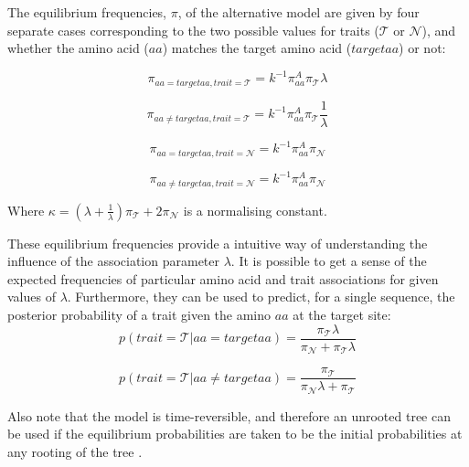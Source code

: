 \documentclass[]{article}
\begin{document}
The equilibrium frequencies, $\pi$, of the alternative model are given by four separate cases corresponding to the two possible values for traits ($\mathcal{T}$ or $\mathcal{N}$), and whether the amino acid ($aa$) matches the target amino acid ($targetaa$) or not:

\begin{equation}
\pi_{aa=targetaa,trait=\mathcal{T}}=k^{-1}\pi_{aa}^{A}\pi_{\mathcal{T}}\lambda
\end{equation}

\begin{equation}
\pi_{aa\neq targetaa,trait=\mathcal{T}}=k^{-1}\pi_{aa}^{A}\pi_{\mathcal{T}}\frac{1}{\lambda}
\end{equation}

\begin{equation}
\pi_{aa=targetaa,trait=\mathcal{N}}=k^{-1}\pi_{aa}^{A}\pi_{\mathcal{N}}
\end{equation}

\begin{equation}
\pi_{aa\neq targetaa,trait=\mathcal{N}}=k^{-1}\pi_{aa}^{A}\pi_{\mathcal{N}}
\end{equation}

Where $\kappa=(\lambda+\frac{1}{\lambda})\pi_{\mathcal{T}}+2\pi_{\mathcal{N}}$ is a normalising constant.

These equilibrium frequencies provide a intuitive way of understanding the influence of the association parameter $\lambda$. It is possible to get a sense of the expected frequencies of particular amino acid and trait associations for given values of $\lambda$. Furthermore, they can be used to predict, for a single sequence, the posterior probability of a trait given the amino $aa$ at the target site:
\begin{equation}
p(trait=\mathcal{T}|aa=targetaa)=\frac{\pi_{\mathcal{T}}\lambda}{\pi_{\mathcal{N}}+\pi_{\mathcal{T}}\lambda}
\end{equation}

\begin{equation}
p(trait=\mathcal{T}|aa\neq targetaa)=\frac{\pi_{\mathcal{T}}}{\pi_{\mathcal{N}}\lambda+\pi_{\mathcal{T}}}
\end{equation}

Also note that the model is time-reversible, and therefore an unrooted tree can be used if the equilibrium probabilities are taken to be the initial probabilities at any rooting of the tree \citep{felsenstein1981evolutionary}.
\end{document}

